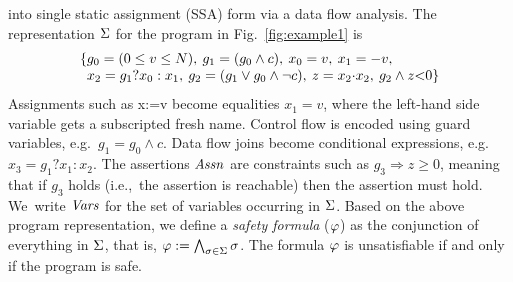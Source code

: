 into single static assignment (SSA) form via a data flow analysis.
%
The representation $\Sigma$ for the program in Fig.~\ref{fig:example1} is 
\begin{equation}\label{eq:ssa}
\begin{array}{l@{}l}
\{ & g_0 = (0 \leq v \leq N),\:
     g_1 = (g_0 \wedge c),\:
     x_0 = v,\:
     x_1 = -v, \\ 
  &  x_2 = g_1?x_0:x_1, \:
     g_2 = (g_1 \vee g_0\wedge \neg c), \:
     z  = x_2{\cdot}x_2,\:
     g_2 \wedge z{<}0 \}
\end{array}
\end{equation}
%
Assignments such as x:=v become equalities $x_1=v$, where the
left-hand side variable gets a subscripted fresh name.
%
Control flow is encoded using guard variables, e.g.~$g_1=g_0\wedge c$.
%
Data flow joins become conditional expressions, e.g.~$x_3=g_1?x_1:x_2$.
%
The assertions $\mathit{Assn}$ are constraints such as $g_3
\Rightarrow z\geq 0$, meaning that if $g_3$ holds
(i.e.,~the assertion is reachable) then the assertion must hold.
%
We~write $\mathit{Vars}$ for the set of variables occurring in $\Sigma$.  
Based on the above program representation, we define a \textit{safety formula}
($\varphi$) as the conjunction of everything in $\Sigma$, that is,  
$\varphi:= \bigwedge_{\sigma\in\Sigma} \sigma$. The formula 
$\varphi$ is unsatisfiable if and only if the program is safe.
%
%

% 


